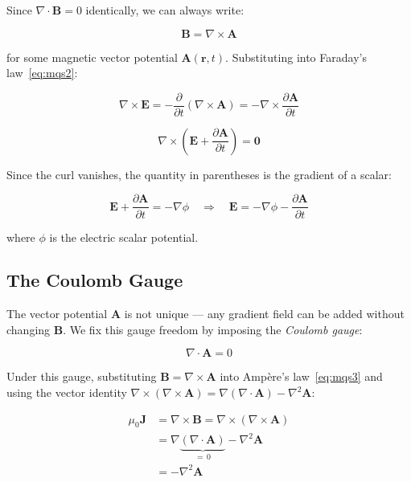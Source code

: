 \documentclass[12pt, a4paper]{article}
\theoremstyle{plain}
\theoremstyle{definition}
\newcommand{\vA}{\mathbf{A}}
\newcommand{\vB}{\mathbf{B}}
\newcommand{\vE}{\mathbf{E}}
\newcommand{\vJ}{\mathbf{J}}
\newcommand{\muZ}{\mu_0}
\newcommand{\Der}[2]{\frac{\partial #1}{\partial #2}}
\begin{document}
Since $\nabla \cdot \vB = 0$ identically, we can always write:

\begin{equation}
  \vB = \nabla \times \vA
  \label{eq:BcurlA}
\end{equation}

for some magnetic vector potential $\vA(\mathbf{r}, t)$. Substituting into
Faraday's law~\eqref{eq:mqs2}:

\begin{equation}
  \nabla \times \vE = -\frac{\partial}{\partial t}\left(\nabla \times \vA\right)
  = -\nabla \times \Der{\vA}{t}
\end{equation}

\begin{equation}
  \nabla \times \left(\vE + \Der{\vA}{t}\right) = \mathbf{0}
\end{equation}

Since the curl vanishes, the quantity in parentheses is the gradient of a scalar:

\begin{equation}
  \vE + \Der{\vA}{t} = -\nabla \phi \quad \Longrightarrow \quad
  \vE = -\nabla\phi - \Der{\vA}{t}
  \label{eq:Ephi}
\end{equation}

where $\phi$ is the electric scalar potential.

\subsection{The Coulomb Gauge}

The vector potential $\vA$ is not unique — any gradient field can be added without
changing $\vB$. We fix this gauge freedom by imposing the \emph{Coulomb gauge}:

\begin{equation}
  \nabla \cdot \vA = 0
  \label{eq:coulomb}
\end{equation}

Under this gauge, substituting $\vB = \nabla \times \vA$ into Amp\`ere's
law~\eqref{eq:mqs3} and using the vector identity
$\nabla \times (\nabla \times \vA) = \nabla(\nabla \cdot \vA) - \nabla^2 \vA$:

\begin{align}
  \muZ \vJ &= \nabla \times \vB = \nabla \times (\nabla \times \vA) \nonumber\\
            &= \nabla\underbrace{(\nabla \cdot \vA)}_{=\,0} - \nabla^2 \vA \nonumber\\
            &= -\nabla^2 \vA
\end{align}
\end{document}
